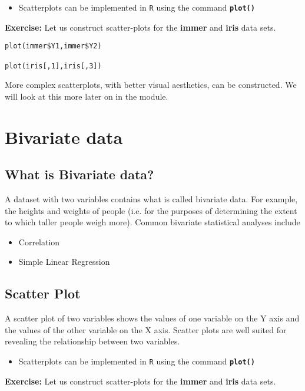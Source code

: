 \begin{itemize}
\item Scatterplots can be implemented in \texttt{R} using the command \texttt{\textbf{plot()}}
\end{itemize}
\noindent \textbf{Exercise:} Let us construct scatter-plots for the \textbf{immer} and \textbf{iris} data sets.

\begin{framed}
\begin{verbatim}
plot(immer$Y1,immer$Y2)

plot(iris[,1],iris[,3])
\end{verbatim}
\end{framed}
More complex scatterplots, with better visual aesthetics, can be constructed. We will look at this more later on in the module.

\newpage

\section{Bivariate data}
\subsection{What is Bivariate data?}

A dataset with two variables contains what is called bivariate data. For example, the heights and weights of people (i.e. for the purposes of determining the extent to which taller people weigh more). Common bivariate statistical analyses include
\begin{itemize}
\item Correlation
\item Simple Linear Regression
\end{itemize}

\subsection{Scatter Plot} A scatter plot of two variables shows the values of one variable on the Y axis and the values of the other variable on the X axis. Scatter plots are well suited for revealing the relationship between two variables.

\begin{itemize}
\item Scatterplots can be implemented in \texttt{R} using the command \texttt{\textbf{plot()}}
\end{itemize}
\noindent \textbf{Exercise:} Let us construct scatter-plots for the \textbf{immer} and \textbf{iris} data sets.

